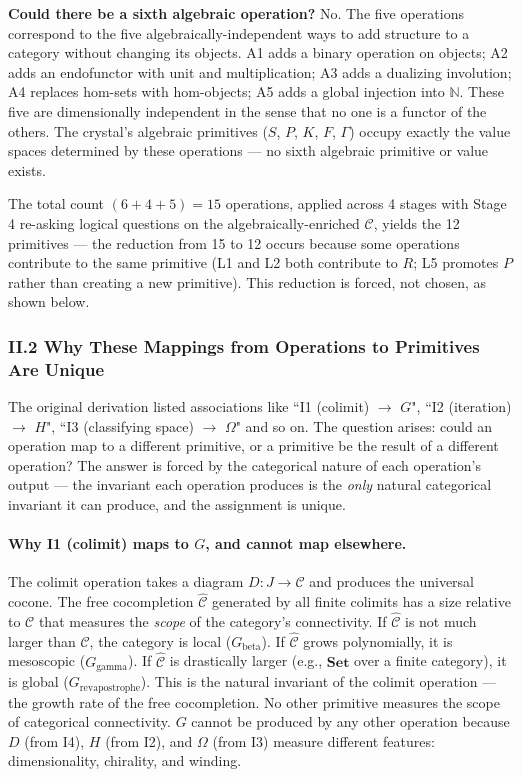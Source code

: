 \documentclass[12pt,a4paper]{article}
\begin{document}
\textbf{Could there be a sixth algebraic operation?} No. The five operations correspond to the five algebraically-independent ways to add structure to a category without changing its objects. A1 adds a binary operation on objects; A2 adds an endofunctor with unit and multiplication; A3 adds a dualizing involution; A4 replaces hom-sets with hom-objects; A5 adds a global injection into $\mathbb{N}$. These five are dimensionally independent in the sense that no one is a functor of the others. The crystal's algebraic primitives ($S$, $P$, $K$, $F$, $\Gamma$) occupy exactly the value spaces determined by these operations --- no sixth algebraic primitive or value exists.

The total count $(6 + 4 + 5) = 15$ operations, applied across 4 stages with Stage 4 re-asking logical questions on the algebraically-enriched $\mathcal{C}$, yields the 12 primitives --- the reduction from 15 to 12 occurs because some operations contribute to the same primitive (L1 and L2 both contribute to $R$; L5 promotes $P$ rather than creating a new primitive). This reduction is forced, not chosen, as shown below.

\subsubsection{II.2 Why These Mappings from Operations to Primitives Are Unique}
The original derivation listed associations like ``I1 (colimit) $\to$ $G$", ``I2 (iteration) $\to$ $H$", ``I3 (classifying space) $\to$ $\Omega$" and so on. The question arises: could an operation map to a different primitive, or a primitive be the result of a different operation? The answer is forced by the categorical nature of each operation's output --- the invariant each operation produces is the \emph{only} natural categorical invariant it can produce, and the assignment is unique.

\paragraph{Why I1 (colimit) maps to $G$, and cannot map elsewhere.}
The colimit operation takes a diagram $D: J \to \mathcal{C}$ and produces the universal cocone. The free cocompletion $\hat{\mathcal{C}}$ generated by all finite colimits has a size relative to $\mathcal{C}$ that measures the \emph{scope} of the category's connectivity. If $\hat{\mathcal{C}}$ is not much larger than $\mathcal{C}$, the category is local ($G_{\text{beta}}$). If $\hat{\mathcal{C}}$ grows polynomially, it is mesoscopic ($G_{\text{gamma}}$). If $\hat{\mathcal{C}}$ is drastically larger (e.g., $\mathbf{Set}$ over a finite category), it is global ($G_{\text{revapostrophe}}$). This is the natural invariant of the colimit operation --- the growth rate of the free cocompletion. No other primitive measures the scope of categorical connectivity. $G$ cannot be produced by any other operation because $D$ (from I4), $H$ (from I2), and $\Omega$ (from I3) measure different features: dimensionality, chirality, and winding.
\end{document}
